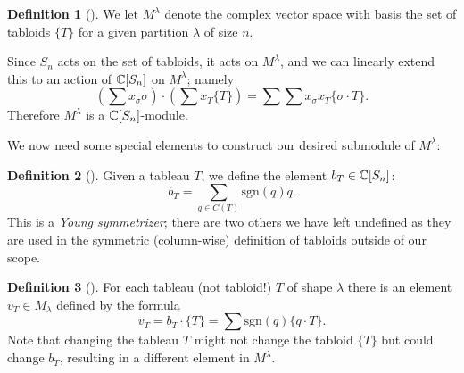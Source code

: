 \documentclass[12pt,twoside]{reedthesis}
\theoremstyle{plain}   %
\theoremstyle{definition}
\newtheorem{defn}{Definition}[section]
\theoremstyle{remark}
\numberwithin{equation}{section}
\def\sgn{\mathrm{sgn}}
\begin{document}
  \begin{defn}[{\cite[Pg. 86]{fulton}}]
    We let $M^\lambda$ denote the complex vector space with basis the set of tabloids $\{T\}$ for a given partition $\lambda$ of size $n$.\par
    Since $S_n$ acts on the set of tabloids, it acts on $M^\lambda$, and we can linearly extend this to an action of $\mathbb{C}[S_n]$ on $M^\lambda$;
    namely
    \[ (\sum x_\sigma \sigma) \cdot (\sum x_T \{T\}) = \sum \sum x_\sigma x_T \{ \sigma \cdot T \}.\]
    Therefore $M^\lambda$ is a $\mathbb{C}[S_n]$-module. 
  \end{defn}
  We now need some special elements to construct our desired submodule of $M^\lambda$:
  \begin{defn}[{\cite[Pg. 86]{fulton}}]
    Given a tableau $T$, we define the element $ b_T \in \mathbb{C}[S_n]$:
    \[b_T = \sum_{q \in C(T)} \sgn(q)q.\]
    This is a \emph{Young symmetrizer}; there are two others we have left undefined as they are used in the symmetric (column-wise)
    definition of tabloids outside of our scope.
  \end{defn}

  \begin{defn}[{\cite[Pg. 86]{fulton}}]
    For each tableau (not tabloid!) $T$ of shape $\lambda$ there is an element $v_T \in M_\lambda$
    defined by the formula
    \[v_T = b_T \cdot \{T\} = \sum \sgn(q) \{q \cdot T\}.\]
    Note that changing the tableau $T$ might not change the tabloid $\{T\}$ but could change $b_T$, resulting in a different element in $M^\lambda$.
  \end{defn}
\end{document}
